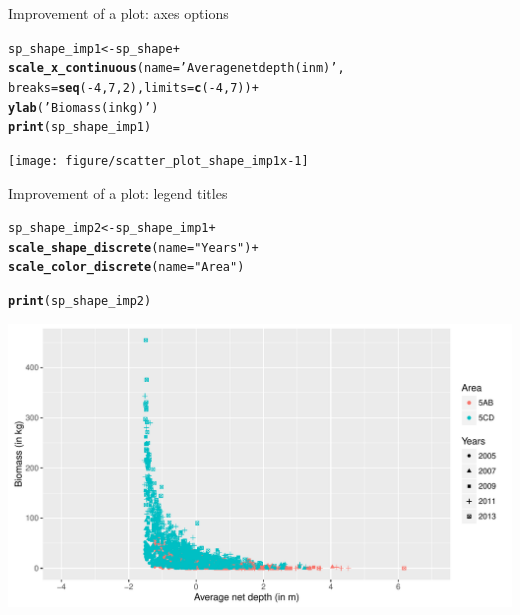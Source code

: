 \documentclass{beamer}\usepackage[]{graphicx}\usepackage[]{color}
\makeatletter
\newcommand{\hlnum}[1]{\textcolor[rgb]{0.686,0.059,0.569}{#1}}%
\newcommand{\hlstr}[1]{\textcolor[rgb]{0.192,0.494,0.8}{#1}}%
\newcommand{\hlopt}[1]{\textcolor[rgb]{0,0,0}{#1}}%
\newcommand{\hlstd}[1]{\textcolor[rgb]{0.345,0.345,0.345}{#1}}%
\newcommand{\hlkwb}[1]{\textcolor[rgb]{0.69,0.353,0.396}{#1}}%
\newcommand{\hlkwc}[1]{\textcolor[rgb]{0.333,0.667,0.333}{#1}}%
\newcommand{\hlkwd}[1]{\textcolor[rgb]{0.737,0.353,0.396}{\textbf{#1}}}%
\newenvironment{kframe}{%
 \def\at@end@of@kframe{}%
 \ifinner\ifhmode%
  \def\at@end@of@kframe{\end{minipage}}%
  \begin{minipage}{\columnwidth}%
 \fi\fi%
 \def\FrameCommand##1{\hskip\@totalleftmargin \hskip-\fboxsep
 \colorbox{shadecolor}{##1}\hskip-\fboxsep
     \hskip-\linewidth \hskip-\@totalleftmargin \hskip\columnwidth}%
 \MakeFramed {\advance\hsize-\width
   \@totalleftmargin\z@ \linewidth\hsize
   \@setminipage}}%
 {\par\unskip\endMakeFramed%
 \at@end@of@kframe}
\newenvironment{knitrout}{}{} %
\makeatother
\begin{document}
\begin{frame}[fragile]{Improvement of a plot: axes options}
\begin{knitrout}\footnotesize
{}\color{fgcolor}\begin{kframe}
\begin{alltt}
\hlstd{sp_shape_imp1} \hlkwb{<-} \hlstd{sp_shape} \hlopt{+}
  \hlkwd{scale_x_continuous}\hlstd{(}\hlkwc{name}\hlstd{=}\hlstr{'Average net depth (in m)'}\hlstd{,}
                     \hlkwc{breaks}\hlstd{=}\hlkwd{seq}\hlstd{(}\hlopt{-}\hlnum{4}\hlstd{,}\hlnum{7}\hlstd{,}\hlnum{2}\hlstd{),} \hlkwc{limits}\hlstd{=}\hlkwd{c}\hlstd{(}\hlopt{-}\hlnum{4}\hlstd{,}\hlnum{7}\hlstd{))} \hlopt{+}
  \hlkwd{ylab}\hlstd{(}\hlstr{'Biomass (in kg)'}\hlstd{)}
\hlkwd{print}\hlstd{(sp_shape_imp1)}
\end{alltt}
\end{kframe}

{\centering \texttt{[image: figure/scatter\_plot\_shape\_imp1x-1]} 

}



\end{knitrout}
\end{frame}

\begin{frame}[fragile]{Improvement of a plot: legend titles}
\begin{knitrout}\footnotesize
{}\color{fgcolor}\begin{kframe}
\begin{alltt}
\hlstd{sp_shape_imp2} \hlkwb{<-} \hlstd{sp_shape_imp1} \hlopt{+}
  \hlkwd{scale_shape_discrete}\hlstd{(}\hlkwc{name}\hlstd{=}\hlstr{"Years"}\hlstd{)} \hlopt{+}
  \hlkwd{scale_color_discrete}\hlstd{(}\hlkwc{name}\hlstd{=}\hlstr{"Area"}\hlstd{)}

\hlkwd{print}\hlstd{(sp_shape_imp2)}
\end{alltt}
\end{kframe}

{\centering \includegraphics[width=.9\linewidth]{figure/scatter_plot_shape_imp2-1} 

}



\end{knitrout}
\end{frame}
\end{document}
